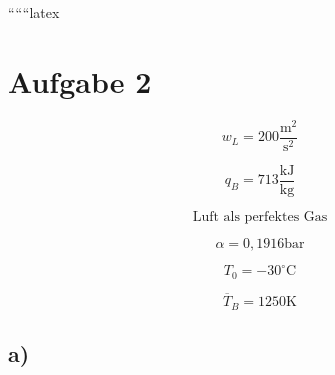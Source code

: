 
``````latex


\section*{Aufgabe 2}

\[
w_L = 200 \frac{\text{m}^2}{\text{s}^2}
\]

\[
q_B = 713 \frac{\text{kJ}}{\text{kg}}
\]

\[
\text{Luft als perfektes Gas}
\]

\[
\alpha = 0,1916 \text{bar}
\]

\[
T_0 = -30^\circ \text{C}
\]

\[
\overline{T}_B = 1250 \text{K}
\]

\subsection*{a)}

